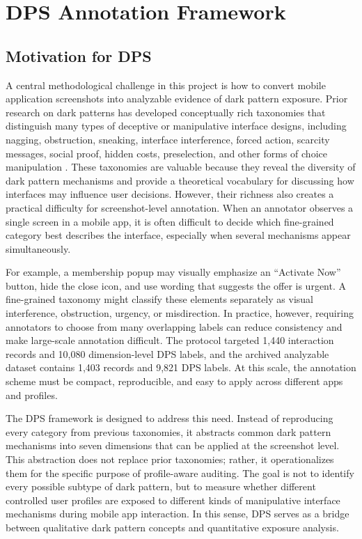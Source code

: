 \chapter{DPS Annotation Framework}

\section{Motivation for DPS}

A central methodological challenge in this project is how to convert mobile application screenshots into analyzable evidence of dark pattern exposure. Prior research on dark patterns has developed conceptually rich taxonomies that distinguish many types of deceptive or manipulative interface designs, including nagging, obstruction, sneaking, interface interference, forced action, scarcity messages, social proof, hidden costs, preselection, and other forms of choice manipulation \cite{gray2018darkpatterns,mathur2019darkpatterns,mathur2021whatmakesdark}. These taxonomies are valuable because they reveal the diversity of dark pattern mechanisms and provide a theoretical vocabulary for discussing how interfaces may influence user decisions. However, their richness also creates a practical difficulty for screenshot-level annotation. When an annotator observes a single screen in a mobile app, it is often difficult to decide which fine-grained category best describes the interface, especially when several mechanisms appear simultaneously.

For example, a membership popup may visually emphasize an ``Activate Now'' button, hide the close icon, and use wording that suggests the offer is urgent. A fine-grained taxonomy might classify these elements separately as visual interference, obstruction, urgency, or misdirection. In practice, however, requiring annotators to choose from many overlapping labels can reduce consistency and make large-scale annotation difficult. The protocol targeted 1,440 interaction records and 10,080 dimension-level DPS labels, and the archived analyzable dataset contains 1,403 records and 9,821 DPS labels. At this scale, the annotation scheme must be compact, reproducible, and easy to apply across different apps and profiles.

The DPS framework is designed to address this need. Instead of reproducing every category from previous taxonomies, it abstracts common dark pattern mechanisms into seven dimensions that can be applied at the screenshot level. This abstraction does not replace prior taxonomies; rather, it operationalizes them for the specific purpose of profile-aware auditing. The goal is not to identify every possible subtype of dark pattern, but to measure whether different controlled user profiles are exposed to different kinds of manipulative interface mechanisms during mobile app interaction. In this sense, DPS serves as a bridge between qualitative dark pattern concepts and quantitative exposure analysis.

